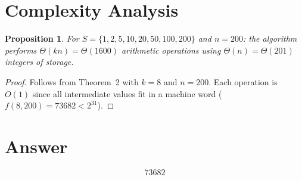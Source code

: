 \documentclass[12pt]{article}
\newtheorem{proposition}[theorem]{Proposition}
\theoremstyle{definition}
\begin{document}
\section{Complexity Analysis}

\begin{proposition}
For $S = \{1, 2, 5, 10, 20, 50, 100, 200\}$ and $n = 200$: the algorithm performs $\Theta(kn) = \Theta(1600)$ arithmetic operations using $\Theta(n) = \Theta(201)$ integers of storage.
\end{proposition}

\begin{proof}
Follows from Theorem~2 with $k = 8$ and $n = 200$. Each operation is $O(1)$ since all intermediate values fit in a machine word ($f(8,200) = 73682 < 2^{31}$).
\end{proof}

\section{Answer}

\[
\boxed{73682}
\]
\end{document}

